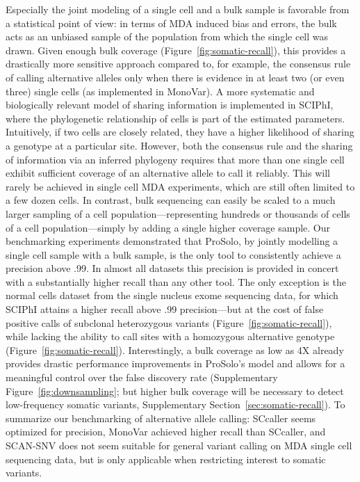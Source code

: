 \documentclass[12pt,inline]{wlscirep}
\begin{document}
Especially the joint modeling of a single cell and a bulk sample is favorable from a statistical point of view: in terms of MDA induced bias and errors, the bulk acts as an unbiased sample of the population from which the single cell was drawn.
Given enough bulk coverage (Figure~\ref{fig:somatic-recall}), this provides a drastically more sensitive approach compared to, for example, the consensus rule of calling alternative alleles only when there is evidence in at least two (or even three) single cells (as implemented in MonoVar\cite{zafar_monovar:_2016}).
A more systematic and biologically relevant model of sharing information is implemented in SCIPhI, where the phylogenetic relationship of cells is part of the estimated parameters.
Intuitively, if two cells are closely related, they have a higher likelihood of sharing a genotype at a particular site.
However, both the consensus rule and the sharing of information via an inferred phylogeny requires that more than one single cell exhibit sufficient coverage of an alternative allele to call it reliably.
This will rarely be achieved in single cell MDA experiments, which are still often limited to a few dozen cells.
In contrast, bulk sequencing can easily be scaled to a much larger sampling of a cell population---representing hundreds or thousands of cells of a cell population---simply by adding a single higher coverage sample.
Our benchmarking experiments demonstrated that ProSolo, by jointly modelling a single cell sample with a bulk sample, is the only tool to consistently achieve a precision above .99.
In almost all datasets this precision is provided in concert with a substantially higher recall than any other tool.
The only exception is the normal cells dataset from the single nucleus exome sequencing data, for which SCIPhI attains a higher recall above .99 precision---but at the cost of false positive calls of subclonal heterozygous variants (Figure~\ref{fig:somatic-recall}), while lacking the ability to call sites with a homozygous alternative genotype (Figure~\ref{fig:somatic-recall}).
Interestingly, a bulk coverage as low as 4X already provides drastic performance improvements in ProSolo's model and allows for a meaningful control over the false discovery rate (Supplementary Figure~\ref{fig:downsampling}; but higher bulk coverage will be necessary to detect low-frequency somatic variants, Supplementary Section~\ref{sec:somatic-recall}).
To summarize our benchmarking of alternative allele calling: SCcaller seems optimized for precision, MonoVar achieved higher recall than SCcaller, and SCAN-SNV does not seem suitable for general variant calling on MDA single cell sequencing data, but is only applicable when restricting interest to somatic variants.
\end{document}
